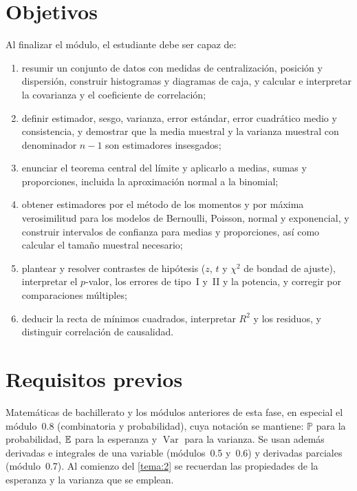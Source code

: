 \documentclass[11pt,a4paper,twoside,openany]{book}
\newcommand{\PP}{\mathbb{P}}
\DeclareMathOperator{\Var}{Var}
\begin{document}
\section*{Objetivos}
Al finalizar el módulo, el estudiante debe ser capaz de:
\begin{enumerate}[label=\arabic*.]
  \item resumir un conjunto de datos con medidas de centralización, posición y dispersión, construir histogramas y diagramas de caja, y calcular e interpretar la covarianza y el coeficiente de correlación;
  \item definir estimador, sesgo, varianza, error estándar, error cuadrático medio y consistencia, y demostrar que la media muestral y la varianza muestral con denominador $n-1$ son estimadores insesgados;
  \item enunciar el teorema central del límite y aplicarlo a medias, sumas y proporciones, incluida la aproximación normal a la binomial;
  \item obtener estimadores por el método de los momentos y por máxima verosimilitud para los modelos de Bernoulli, Poisson, normal y exponencial, y construir intervalos de confianza para medias y proporciones, así como calcular el tamaño muestral necesario;
  \item plantear y resolver contrastes de hipótesis ($z$, $t$ y $\chi^{2}$ de bondad de ajuste), interpretar el $p$-valor, los errores de tipo~I y~II y la potencia, y corregir por comparaciones múltiples;
  \item deducir la recta de mínimos cuadrados, interpretar $R^{2}$ y los residuos, y distinguir correlación de causalidad.
\end{enumerate}

\section*{Requisitos previos}
Matemáticas de bachillerato y los módulos anteriores de esta fase, en especial el módulo~0.8 (combinatoria y probabilidad), cuya notación se mantiene: $\PP$ para la probabilidad, $\mathbb{E}$ para la esperanza y $\Var$ para la varianza. Se usan además derivadas e integrales de una variable (módulos~0.5 y~0.6) y derivadas parciales (módulo~0.7). Al comienzo del \cref{tema:2} se recuerdan las propiedades de la esperanza y la varianza que se emplean.
\end{document}
